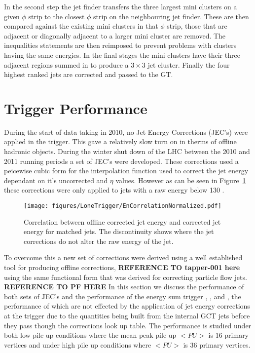 In the second step the jet finder transfers the three largest mini clusters on 
a given $\phi$ strip to the closest $\phi$ strip on the neighbouring jet finder.
These are then compared against the existing mini clusters in that $\phi$ strip,
those that are adjacent or diagonally adjacent to a larger mini cluster are 
removed. The inequalities statements are then reimposed to prevent problems
with clusters having the same energies. In the final stages the mini clusters
have their three adjacent regions summed in to produce a $3 \times 3$ jet
cluster. Finally the four highest ranked jets are corrected and passed to the 
GT.

\section{\Lone Trigger Performance} %

During the start of data taking in 2010, no Jet Energy Corrections (JEC's) were applied in the \Lone trigger. This gave a relatively slow turn on in therms of offline hadronic objects.
During the winter shut down of the LHC between the 2010 and 2011 running periods a set of \Lone JEC's were developed. These corrections used a peicewise cubic form for the interpolation function used to correct the jet energy dependant on it's uncorrected \ET and $\eta$ values. However as can be seen in
Figure~\ref{fig:figures_LoneTrigger_EnCorrelationNormalized} these corrections were only applied to jets with a raw energy below 130 \GeV.

\begin{figure}[htbp]
  \centering
    \texttt{[image: figures/LoneTrigger/EnCorrelationNormalized.pdf]}
  \caption{Correlation between offline corrected jet energy and \Lone corrected jet energy for matched jets. The discontinuity shows where the \Lone jet corrections do not alter the raw energy of the jet.}
  \label{fig:figures_LoneTrigger_EnCorrelationNormalized}
\end{figure}

To overcome this a new set of corrections were derived using a well established tool for producing offline corrections, \textbf{REFERENCE TO tapper-001 here} using the same functional form that was derived for correcting particle flow jets. \textbf{REFERENCE TO PF HERE}
In this section we discuss the performance of both sets of \Lone JEC's and the performance of the energy sum trigger \HT, \HTm, and \MET, the performance of which are not effected by the application of jet energy corrections at the \Lone trigger due to the quantities being built from the internal GCT jets before they pass though the corrections look up table.
The performance is studied under both low pile up conditions where the mean peak pile up $<PU>$ is 16 primary vertices and under high pile up conditions where $<PU>$ is 36 primary vertices.

